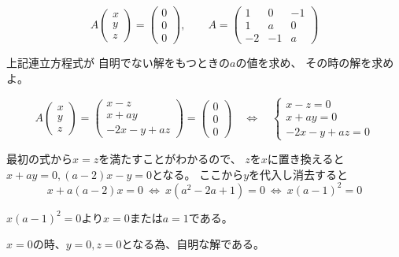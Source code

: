 \documentclass[12pt,b5paper]{ltjsarticle}
\begin{document}
\hrulefill

\begin{equation}
 A
  \begin{pmatrix}
   x\\y\\z
  \end{pmatrix}
  =
  \begin{pmatrix}
   0\\0\\0
  \end{pmatrix}
  ,\qquad
 A=
  \begin{pmatrix}
   1 & 0 & -1\\
   1 & a & 0\\
   -2 & -1 & a
  \end{pmatrix}
\end{equation}

上記連立方程式が
自明でない解をもつときの$a$の値を求め、
その時の解を求めよ。

\dotfill


\begin{equation}
 A
  \begin{pmatrix}
   x\\y\\z
  \end{pmatrix}
  =
  \begin{pmatrix}
   x-z \\x + ay \\ -2x-y+az
  \end{pmatrix}
  =
  \begin{pmatrix}
   0\\0\\0
  \end{pmatrix}
  \quad
  \Leftrightarrow
  \quad
  \begin{cases}
   x-z=0 \\ x+ay=0 \\ -2x-y+az=0
  \end{cases}
\end{equation}

最初の式から$x=z$を満たすことがわかるので、
$z$を$x$に置き換えると
$x+ay=0,(a-2)x-y=0$となる。
ここから$y$を代入し消去すると
\begin{equation}
 x+a(a-2)x=0
  \ \Leftrightarrow\
  x(a^2-2a+1)=0
  \ \Leftrightarrow\
  x(a-1)^2=0
\end{equation}

$x(a-1)^2=0$より$x=0$または$a=1$である。

$x=0$の時、$y=0,z=0$となる為、自明な解である。
\end{document}
